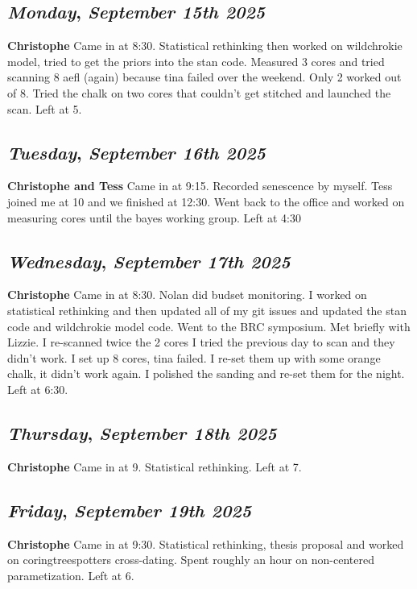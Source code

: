\def\day{\textit{September 15th 2025}}
\def\weekday{\textit{Monday}}
\subsection*{\weekday, \day}
\textbf {Christophe}
Came in at 8:30. Statistical rethinking then worked on wildchrokie model, tried to get the priors into the stan code. Measured 3 cores and tried scanning 8 aefl (again) because tina failed over the weekend. Only 2 worked out of 8. Tried the chalk on two cores that couldn't get stitched and launched the scan. Left at 5. 

\def\day{\textit{September 16th 2025}}
\def\weekday{\textit{Tuesday}}
\subsection*{\weekday, \day}
\textbf {Christophe and Tess}
Came in at 9:15. Recorded senescence by myself. Tess joined me at 10 and we finished at 12:30. Went back to the office and worked on measuring cores until the bayes working group. Left at 4:30\

\def\day{\textit{September 17th 2025}}
\def\weekday{\textit{Wednesday}}
\subsection*{\weekday, \day}
\textbf {Christophe}
Came in at 8:30. Nolan did budset monitoring. I worked on statistical rethinking and then updated all of my git issues and updated the stan code and wildchrokie model code. Went to the BRC symposium. Met briefly with Lizzie. I re-scanned twice the 2 cores I tried the previous day to scan and they didn't work. I set up 8 cores, tina failed. I re-set them up with some orange chalk, it didn't work again. I polished the sanding and re-set them for the night. Left at 6:30. 

\def\day{\textit{September 18th 2025}}
\def\weekday{\textit{Thursday}}
\subsection*{\weekday, \day}
\textbf {Christophe}
Came in at 9. Statistical rethinking. Left at 7.

\def\day{\textit{September 19th 2025}}
\def\weekday{\textit{Friday}}
\subsection*{\weekday, \day}
\textbf {Christophe}
Came in at 9:30. Statistical rethinking, thesis proposal and worked on coringtreespotters cross-dating. Spent roughly an hour on non-centered parametization. Left at 6. 

